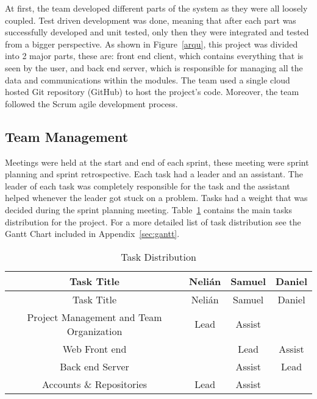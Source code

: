 
At first, the team developed different parts of
the system as they were all loosely coupled. Test driven development was
done, meaning that after each part was successfully developed and unit tested,
only then they were integrated and tested from a bigger perspective. As shown in Figure~\ref{arqu}, this project
was divided into 2 major parts, these are: front end client, which contains everything that is seen by the user, and back end server, which is responsible for managing all the data and communications within the modules. The team used a single cloud hosted Git repository (GitHub) to host the project's
code. Moreover, the
team followed the Scrum agile development process.


\subsection{Team Management}

Meetings were held at the start and end of each sprint, these meeting were
sprint planning and sprint retrospective. Each task had a leader and an
assistant. The leader of each task was completely responsible for the task and
the assistant helped whenever the leader got stuck on a problem. Tasks had a weight that was decided during the sprint planning
meeting. Table~\ref{tasks} contains the main tasks distribution for the project.
For a more detailed list of task distribution see the Gantt Chart included in Appendix~\ref{sec:gantt}.

\setlength{\extrarowheight}{1.5pt}
  \begin{longtable}{|c|c|c|c|}
 \caption{Task Distribution \label{tasks}} \\
   \hline
  
  \centering Task Title & Nelián & Samuel & Daniel \\
  \hline \hline \endfirsthead
  
     \hline

	\centering Task Title & Nelián & Samuel & Daniel \\  
	\hline \hline \endhead
  
  \endfoot  
  
  Project Management and Team Organization & Lead & Assist & \\ \hline
  Web Front end & & Lead & Assist \\ \hline
  Back end Server & & Assist & Lead \\ \hline
  Accounts \& Repositories & Lead & Assist &\\ \hline
   \end{longtable}
   
